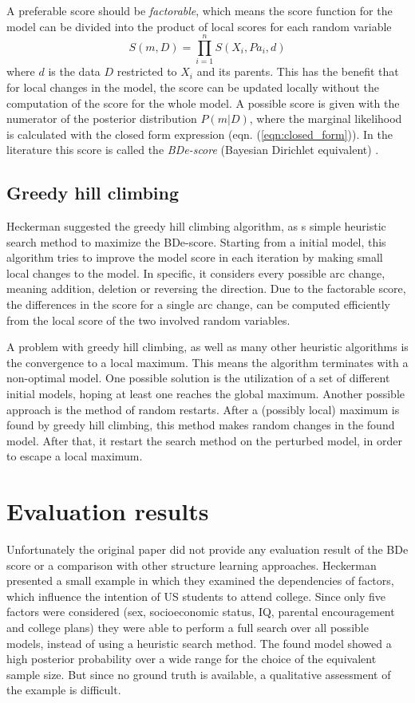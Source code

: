 \documentclass{article}
\begin{document}
	A preferable score should be \textit{factorable}, which means the score function for the model
	can be divided into the product of local scores for each
	random variable
	\[
		S(m,D) = \prod_{i=1}^n S(X_i, Pa_i, d)
	\]
	where $d$ is the data $D$ restricted to $X_i$ and its parents. This has the benefit that for local changes
	in the model, the score can be updated locally without the computation of the score for the whole model.
	A possible score is given with the numerator of the posterior distribution $P(m|D)$, where the
	marginal likelihood is calculated with the closed form expression (eqn. (\ref{eqn:closed_form})).
	In the literature this score is called the \textit{BDe-score} (Bayesian Dirichlet equivalent)
	\cite{hcg}.
	
	\subsection{Greedy hill climbing}
	Heckerman suggested the greedy hill climbing algorithm, as s simple heuristic
	search method to maximize the BDe-score. Starting from a initial model, this algorithm
	tries to improve the model score in each iteration by making small local changes to
	the model. In specific, it considers every possible arc change, meaning addition, deletion
	or reversing the direction. Due to the factorable score, the differences in the score for a single
	arc change, can be computed efficiently from the local score of the two involved random variables.
	
	A problem with greedy hill climbing, as well as many other heuristic algorithms is the convergence
	to a local maximum. This means the algorithm terminates with a non-optimal model. One possible
	solution is the utilization of a set of different initial models, hoping at least one reaches
	the global maximum. Another possible approach is the method of random restarts. After a (possibly local)
  maximum is found by greedy hill climbing, this method makes random changes in the found model.
  After that, it restart the search method on the perturbed model, in order to escape a local maximum.
	
\section{Evaluation results}
Unfortunately the original paper did not provide any evaluation result of the BDe score or a
comparison with other structure learning approaches. Heckerman presented a small example
in which they examined the dependencies of factors, which influence the intention of
US students to attend college. Since only five factors were considered (sex, socioeconomic status,
IQ, parental encouragement and college plans) they were able to perform a full search over
all possible models, instead of using a heuristic search method. The found model showed a
high posterior probability over a wide range for the choice of the equivalent sample size.
But since no ground truth is available, a qualitative assessment of the example is difficult.
\end{document}
